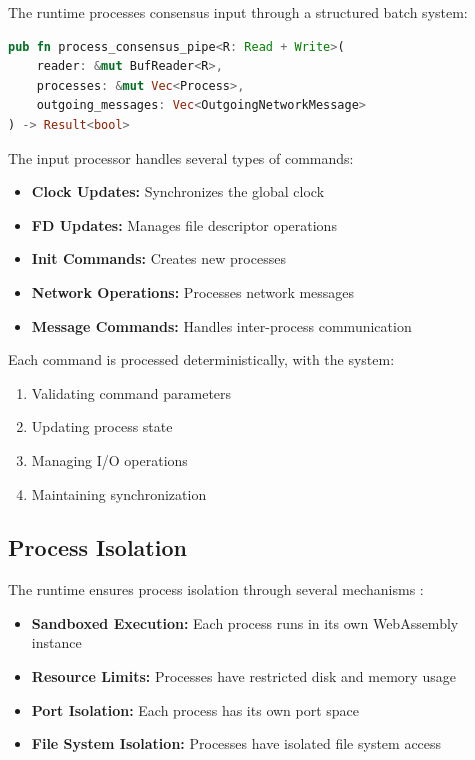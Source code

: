 \documentclass[10pt, 
]{IEEEtran}
\begin{document}
The runtime processes consensus input through a structured batch system:

\begin{lstlisting}[language=Rust]
pub fn process_consensus_pipe<R: Read + Write>(
    reader: &mut BufReader<R>,
    processes: &mut Vec<Process>,
    outgoing_messages: Vec<OutgoingNetworkMessage>
) -> Result<bool>
\end{lstlisting}

The input processor handles several types of commands:
\begin{itemize}
    \item \textbf{Clock Updates:} Synchronizes the global clock
    \item \textbf{FD Updates:} Manages file descriptor operations
    \item \textbf{Init Commands:} Creates new processes
    \item \textbf{Network Operations:} Processes network messages
    \item \textbf{Message Commands:} Handles inter-process communication
\end{itemize}

Each command is processed deterministically, with the system:
\begin{enumerate}
    \item Validating command parameters
    \item Updating process state
    \item Managing I/O operations
    \item Maintaining synchronization
\end{enumerate}

\subsection{Process Isolation}

The runtime ensures process isolation through several mechanisms \cite{replicode2025}:

\begin{itemize}
    \item \textbf{Sandboxed Execution:} Each process runs in its own WebAssembly instance
    \item \textbf{Resource Limits:} Processes have restricted disk and memory usage
    \item \textbf{Port Isolation:} Each process has its own port space
    \item \textbf{File System Isolation:} Processes have isolated file system access
\end{itemize}
\end{document}
